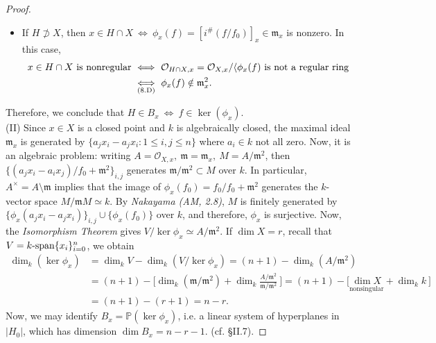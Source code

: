 \documentclass[11pt,a4paper,footinclude=true,headinclude=true]{scrbook} %
\newcommand{\OO}{\mathcal{O}}
\newcommand{\PP}{\mathbb{P}}
\newcommand{\mm}{\mathfrak{m}}
\newcommand{\<}{\langle}
\let\>\relax
\newcommand{\>}{\rangle}
\newcommand{\spn}{\mathchar`-\mathrm{span}}
\begin{document}
\begin{proof}
\begin{itemize}
        \begin{align*}
            H\supset X\ \text{(as a closed subscheme)}\  &\Longleftrightarrow\ f\in I\ \Longleftrightarrow\ \Big[i^\#\Big(\frac{f}{f_0}\Big)\Big]_x=\Big[\frac{f}{f_0}\Big]_x+\<\phi_x(f)\>\\
            &\Longleftrightarrow\ \phi_x(f)=0\ \text{in}\ \mm_x=\mm_{Y,x}/\<\phi_x(f)\>.
        \end{align*}
        \item If $H\not\supset X$, then $x\in H\cap X\ \Longleftrightarrow\ \phi_x(f)=[i^\#(f/f_0)]_x\in\mm_x$ is nonzero. In this case, 
        \begin{align*}
            x\in H\cap X\ \text{is nonregular}\ &\Longleftrightarrow\ \OO_{H\cap X,x}=\OO_{X,x}/\<\phi_x(f)\>\ \text{is not a regular ring}\\ &\underset{\text{(8.D)}}{\Longleftrightarrow}\ \phi_x(f)\notin\mm_x^2.
        \end{align*}
    \end{itemize}
     Therefore, we conclude that $H\in B_x\ \Longleftrightarrow\ f\in\ker(\phi_x)$. \\
     
     (II) Since $x\in X$ is a closed point and $k$ is algebraically closed, the maximal ideal $\mm_x$ is generated by $\{a_jx_i-a_jx_i:1\leq i,j\leq n\}$ where $a_i\in k$ not all zero. Now, it is an algebraic problem: writing $A=\OO_{X,x},\ \mm=\mm_x,\ M=A/\mm^2$, then
     $\{(a_jx_i-a_ix_j)/f_0+\mm^2\}_{i,j}$ generates $\mm/\mm^2\subset M$ over $k$. In particular, $A^\times=A\setminus\mm$ implies that the image of $\phi_x(f_0)=f_0/f_0+\mm^2$ generates the $k$-vector space $M/\mm M\simeq k$. By \textit{Nakayama (AM, 2.8)}, $M$ is finitely generated by $\{\phi_x(a_jx_i-a_jx_i)\}_{i,j}\cup\{\phi_x(f_0)\}$ over $k$, and therefore, $\phi_x$ is surjective. Now, the \textit{Isomorphism Theorem} gives $V/\ker\phi_x\simeq A/\mm^2$. If $\dim X=r$, recall that $V=k\spn\{x_i\}_{i=0}^n$, we obtain
     \begin{align*}
         \dim_k(\ker\phi_x) &=\dim_kV-\dim_k(V/\ker\phi_x)=(n+1)-\dim_k(A/\mm^2)\\ &=(n+1)-\Big[\dim_k(\mm/\mm^2)+\dim_k\frac{A/\mm^2}{\mm/\mm^2}\ \Big]=(n+1)-\Big[\underset{\text{nonsingular}}{\dim X}+\dim_kk\ \Big]\\ &=(n+1)-(r+1)=n-r.
     \end{align*}
     Now, we may identify $B_x=\PP(\ker\phi_x)$, i.e. a linear system of hyperplanes in $|H_0|$, which has dimension $\dim B_x=n-r-1$. (cf. \S II.7).
\end{proof}
\end{document}

